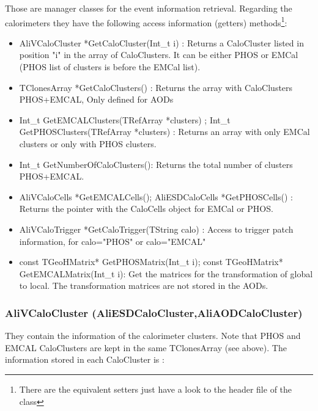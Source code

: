 Those are manager classes for the event information retrieval. Regarding the calorimeters they have the following access information (getters) methods\footnote{There are the equivalent setters just have a look to the header file of the class}:
\begin{itemize}

\item AliVCaloCluster *GetCaloCluster(Int\_t i) : Returns a CaloCluster listed in position "i" in the array of CaloClusters. It can be either PHOS or EMCal (PHOS list of clusters is before the EMCal list).

\item TClonesArray *GetCaloClusters() :  Returns the array with CaloClusters PHOS+EMCAL, Only defined for AODs

\item Int\_t GetEMCALClusters(TRefArray *clusters) ; Int\_t GetPHOSClusters(TRefArray *clusters) : Returns an array with only EMCal clusters or only with PHOS clusters.

\item Int\_t GetNumberOfCaloClusters(): Returns the total number of clusters PHOS+EMCAL.

\item AliVCaloCells *GetEMCALCells();  AliESDCaloCells *GetPHOSCells() : Returns the pointer with the CaloCells object for EMCal or PHOS.

\item AliVCaloTrigger *GetCaloTrigger(TString calo) : Access to trigger patch information, for calo="PHOS" or calo="EMCAL"

\item const TGeoHMatrix* GetPHOSMatrix(Int\_t i); const TGeoHMatrix* GetEMCALMatrix(Int\_t i): Get the matrices for the transformation of global to local. The transformation matrices are not stored in the AODs.



\end{itemize}



\subsubsection{AliVCaloCluster (AliESDCaloCluster,AliAODCaloCluster)}

They  contain the information of the calorimeter clusters. Note that PHOS and EMCAL CaloClusters are kept in the same TClonesArray (see above). The information stored in each CaloCluster is :

